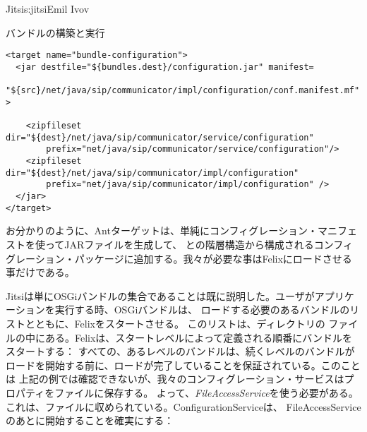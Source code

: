 \begin{aosachapter}{Jitsi}{s:jitsi}{Emil Ivov}
\begin{aosasect1}{バンドルの構築と実行}
\begin{verbatim}
<target name="bundle-configuration">
  <jar destfile="${bundles.dest}/configuration.jar" manifest=
    "${src}/net/java/sip/communicator/impl/configuration/conf.manifest.mf" >

    <zipfileset dir="${dest}/net/java/sip/communicator/service/configuration"
        prefix="net/java/sip/communicator/service/configuration"/>
    <zipfileset dir="${dest}/net/java/sip/communicator/impl/configuration"
        prefix="net/java/sip/communicator/impl/configuration" />
  </jar>
</target>
\end{verbatim}

お分かりのように、Antターゲットは、単純にコンフィグレーション・マニフェストを使ってJARファイルを生成して、
との階層構造から構成されるコンフィグレーション・パッケージに追加する。我々が必要な事はFelixにロードさせる事だけである。

Jitsiは単にOSGiバンドルの集合であることは既に説明した。ユーザがアプリケーションを実行する時、OSGiバンドルは、
ロードする必要のあるバンドルのリストとともに、Felixをスタートさせる。 このリストは、ディレクトリの
ファイルの中にある。Felixは、スタートレベルによって定義される順番にバンドルをスタートする：
すべての、あるレベルのバンドルは、続くレベルのバンドルがロードを開始する前に、ロードが完了していることを保証されている。このことは
上記の例では確認できないが、我々のコンフィグレーション・サービスはプロパティをファイルに保存する。
よって、\emph{FileAccessService}を使う必要がある。これは、ファイルに収められている。ConfigurationServiceは、
FileAccessServiceのあとに開始することを確実にする：


\end{aosasect1}
\end{aosachapter}
